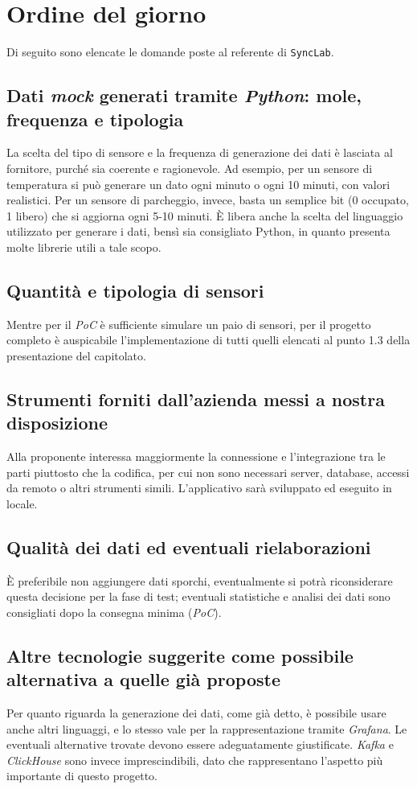 \section{Ordine del giorno}
Di seguito sono elencate le domande poste al referente di \texttt{SyncLab}.

\subsection{Dati \textit{mock} generati tramite \textit{Python}: mole, frequenza e tipologia}
La scelta del tipo di sensore e la frequenza di generazione dei dati è lasciata al fornitore, purché sia coerente e ragionevole. Ad esempio, per un sensore di temperatura si può generare un dato ogni minuto o ogni 10 minuti, con valori realistici. Per un sensore di parcheggio, invece, basta un semplice bit (0 occupato, 1 libero) che si aggiorna ogni 5-10 minuti. È libera anche la scelta del linguaggio utilizzato per generare i dati, bensì sia consigliato Python, in quanto presenta molte librerie utili a tale scopo.

\subsection{Quantità e tipologia di sensori}
Mentre per il \textit{PoC} è sufficiente simulare un paio di sensori, per il progetto completo è auspicabile l'implementazione di tutti quelli elencati al punto 1.3 della presentazione del capitolato.

\subsection{Strumenti forniti dall'azienda messi a nostra disposizione}
Alla proponente interessa maggiormente la connessione e l'integrazione tra le parti piuttosto che la codifica, per cui non sono necessari server, database, accessi da remoto o altri strumenti simili. L'applicativo sarà sviluppato ed eseguito in locale.

\subsection{Qualità dei dati ed eventuali rielaborazioni}
È preferibile non aggiungere dati sporchi, eventualmente si potrà riconsiderare questa decisione per la fase di test; eventuali statistiche e analisi dei dati sono consigliati dopo la consegna minima (\textit{PoC}).

\subsection{Altre tecnologie suggerite come possibile alternativa a quelle già proposte}
Per quanto riguarda la generazione dei dati, come già detto, è possibile usare anche altri linguaggi, e lo stesso vale per la rappresentazione tramite \textit{Grafana}. Le eventuali alternative trovate devono essere adeguatamente giustificate. \textit{Kafka} e \textit{ClickHouse} sono invece imprescindibili, dato che rappresentano l'aspetto più importante di questo progetto.

